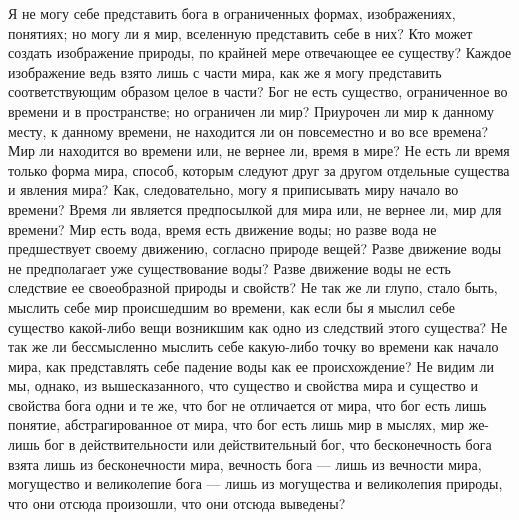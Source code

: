 \documentclass[12pt]{article}
\begin{document}
Я не могу себе представить бога в ограниченных формах, изображениях, понятиях; но могу ли я мир, вселенную представить себе в них? Кто может создать изображение природы, по крайней мере отвечающее ее существу? Каждое изображение ведь взято лишь с части мира, как же я могу представить соответствующим образом целое в части? Бог не есть существо, ограниченное во времени и в пространстве; но ограничен ли мир? Приурочен ли мир к данному месту, к данному времени, не находится ли он повсеместно и во все времена? Мир ли находится во времени или, не вернее ли, время в мире? Не есть ли время только форма мира, способ, которым следуют друг за другом отдельные существа и явления мира? Как, следовательно, могу я приписывать миру начало во времени? Время ли является предпосылкой для мира или, не вернее ли, мир для времени? Мир есть вода, время есть движение воды; но разве вода не предшествует своему движению, согласно природе вещей? Разве движение воды не предполагает уже существование воды? Разве движение воды не есть следствие ее своеобразной природы и свойств? Не так же ли глупо, стало быть, мыслить себе мир происшедшим во времени, как если бы я мыслил себе существо какой-либо вещи возникшим как одно из следствий этого существа? Не так же ли бессмысленно мыслить себе какую-либо точку во времени как начало мира, как представлять себе падение воды как ее происхождение? Не видим ли мы, однако, из вышесказанного, что существо и свойства мира и существо и свойства бога одни и те же, что бог не отличается от мира, что бог есть лишь понятие, абстрагированное от мира, что бог есть лишь мир в мыслях, мир же- лишь бог в действительности или действительный бог, что бесконечность бога взята лишь из бесконечности мира, вечность бога --- лишь из вечности мира, могущество и великолепие бога --- лишь из могущества и великолепия природы, что они отсюда произошли, что они отсюда выведены? 
\end{document}
